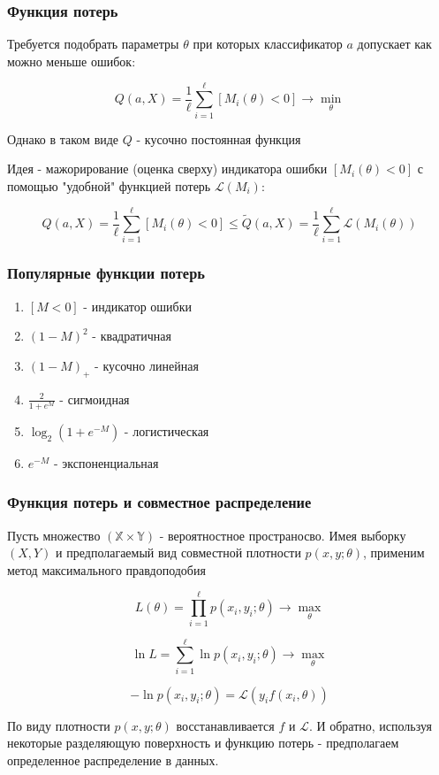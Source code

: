 \documentclass{beamer}
\begin{document}
	\begin{frame}
		\frametitle{Функция потерь}
		Требуется подобрать параметры $\theta$ при которых классификатор $a$ допускает как можно меньше ошибок:
		
		\[
		Q(a, X) = \frac{1}{\ell} \sum_{i=1}^{\ell} [M_i(\theta) < 0] \rightarrow \min_{\theta}
		\]
		
		Однако в таком виде $Q$ - кусочно постоянная функция
		
		\vspace{15pt}
		
		Идея - мажорирование (оценка сверху) индикатора ошибки $[M_i(\theta) < 0]$ с помощью "удобной" функцией потерь $\mathcal{L}(M_i)$:
		
		\[
		Q(a, X) = \frac{1}{\ell} \sum_{i=1}^{\ell} [M_i(\theta) < 0]
		\le
		\widetilde{Q}(a, X) = \frac{1}{\ell} \sum_{i=1}^{\ell} \mathcal{L}(M_i(\theta))
		\]
	\end{frame}
	
	\begin{frame}
		\frametitle{Популярные функции потерь}
		\begin{enumerate}
			\item $[M < 0]$ - индикатор ошибки
			\item $(1 - M)^2$ - квадратичная
			\item $(1 - M)_{+}$ - кусочно линейная
			\item $\frac{2}{1 + e^M}$ - сигмоидная
			\item $\log_2(1 + e^{-M})$ - логистическая
			\item $e^{-M}$ - экспоненциальная
		\end{enumerate}
	\end{frame}
	
	\begin{frame}
		\frametitle{Функция потерь и совместное распределение}
		Пусть множество $(\mathbb{X} \times \mathbb{Y})$ - вероятностное пространосво. Имея выборку $(X, Y)$ и предполагаемый вид совместной плотности $p(x, y; \theta)$, применим метод максимального правдоподобия
		
		\[
		L(\theta) = \prod_{i=1}^{\ell} p(x_i, y_i; \theta) \rightarrow \max_{\theta}
		\]
		
		\[
		\ln L = \sum_{i=1}^{\ell} \ln p(x_i, y_i; \theta) \rightarrow \max_{\theta}
		\]
		
		\[
		- \ln p(x_i, y_i; \theta) = \mathcal{L}(y_i f(x_i, \theta))
		\]
		
		По виду плотности $p(x, y; \theta)$ восстанавливается $f$ и $\mathcal{L}$. И обратно, используя некоторые разделяющую поверхность и функцию потерь - предполагаем определенное распределение в данных.
	\end{frame}
	
\end{document}
